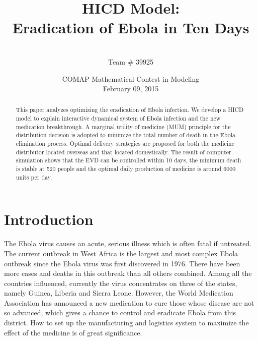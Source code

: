 \documentclass[12pt,a4paper,titlepage]{article}
\begin{document}
\title{ HICD Model: \\Eradication of Ebola in Ten Days}
\author{\vspace{25pt}\\Team \# 39925\\ \vspace{25pt}}
\date{COMAP Mathematical Contest in Modeling\\February 09, 2015}
\maketitle


\begin{abstract}
This paper analyzes optimizing the eradication of Ebola infection. We develop a HICD model to explain interactive dynamical system of Ebola infection and the new medication breakthrough. A marginal utility of medicine (MUM) principle for the distribution decision is adopted to minimize the total number of death in the Ebola elimination process. Optimal delivery strategies are proposed for both the medicine distributor located overseas and that located domestically. The result of computer simulation shows that the EVD can be controlled within 10 days, the minimum death is stable at 520 people and the optimal daily production of medicine is around 6000 units per day.
\end{abstract}
\newpage\tableofcontents\newpage

\section{Introduction}

The Ebola virus causes an acute, serious illness which is often fatal if untreated. The current outbreak in West Africa is the largest and most complex Ebola outbreak since the Ebola virus was first discovered in 1976. There have been more cases and deaths in this outbreak than all others combined. Among all the countries influenced, currently the virus concentrates on three of the states, namely Guinea, Liberia and Sierra Leone. However, the World Medication Association has announced a new medication to cure those whose disease are not so advanced, which gives a chance to control and eradicate Ebola from this district. How to set up the manufacturing and logistics system to maximize the effect of the medicine is of great significance. 
\end{document}

